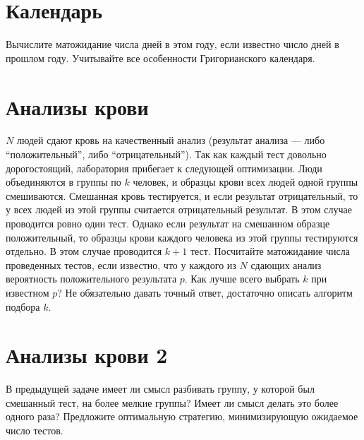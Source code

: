 \documentclass[12pt]{article}
\begin{document}
\section{Календарь}

Вычислите матожидание числа дней в этом году, если известно число дней в прошлом году. Учитывайте все особенности Григорианского календаря.

\section{Анализы крови}

$N$ людей сдают кровь на качественный анализ (результат анализа --- либо ``положительный'', либо ``отрицательный''). Так как каждый тест довольно дорогостоящий, лаборатория прибегает к следующей оптимизации. Люди объединяются в группы по $k$ человек, и образцы крови всех людей одной группы смешиваются. Смешанная кровь тестируется, и если результат отрицательный, то у всех людей из этой группы считается отрицательный результат. В этом случае проводится ровно один тест. Однако если результат на смешанном образце положительный, то образцы крови каждого человека из этой группы тестируются отдельно. В этом случае проводится $k + 1$ тест. Посчитайте матожидание числа проведенных тестов, если известно, что у каждого из $N$ сдающих анализ вероятность положительного результата $p$. Как лучше всего выбрать $k$ при известном $p$? Не обязательно давать точный ответ, достаточно описать алгоритм подбора $k$.

\section{Анализы крови 2}

В предыдущей задаче имеет ли смысл разбивать группу, у которой был смешанный тест, на более мелкие группы? Имеет ли смысл делать это более одного раза? Предложите оптимальную стратегию, минимизирующую ожидаемое число тестов.
\end{document}
